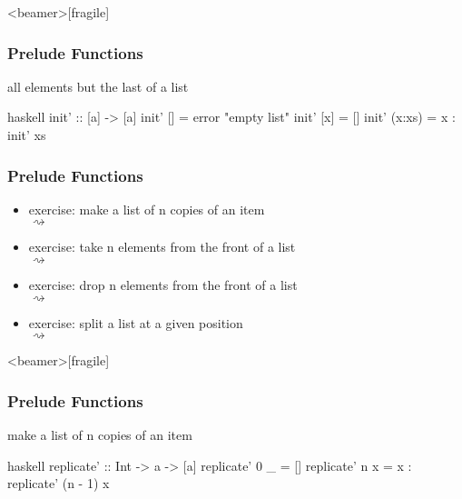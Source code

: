 \documentclass[dvipsnames]{beamer}
\theoremstyle{plain}
\begin{document}
\begin{frame}<beamer>[fragile]
  \frametitle{Prelude Functions}

  \begin{exampleblock}{all elements but the last of a list}
    \begin{pygments}{haskell}
init' :: [a] -> [a]
init' []     = error "empty list"
init' [x]    = []
init' (x:xs) = x : init' xs
    \end{pygments}
  \end{exampleblock}
\end{frame}

\begin{frame}
  \frametitle{Prelude Functions}

  \begin{itemize}
    \item exercise: make a list of n copies of an item\\
       $\rightsquigarrow$
    \item exercise: take n elements from the front of a list\\
       $\rightsquigarrow$
    \item exercise: drop n elements from the front of a list\\
       $\rightsquigarrow$
    \item exercise: split a list at a given position\\
       $\rightsquigarrow$
  \end{itemize}
\end{frame}

\begin{frame}<beamer>[fragile]
  \frametitle{Prelude Functions}

  \begin{exampleblock}{make a list of n copies of an item}
    \begin{pygments}{haskell}
replicate' :: Int -> a -> [a]
replicate' 0 _ = []
replicate' n x = x : replicate' (n - 1) x
    \end{pygments}
  \end{exampleblock}
\end{frame}
\end{document}
